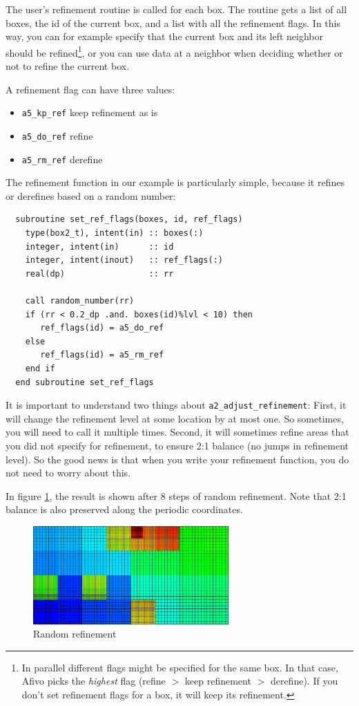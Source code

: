 \documentclass[a4paper, a4wide]{article}
\begin{document}
The user's refinement routine is called for each box.
The routine gets a list of all boxes, the id of the current box, and a list with
all the refinement flags.
In this way, you can for example specify that the current box and its left
neighbor should be refined\footnote{In parallel different flags might be
  specified for the same box.
  In that case, Afivo picks the \emph{highest} flag (refine $>$ keep refinement
  $>$ derefine).
  If you don't set refinement flags for a box, it will keep its refinement.}, or
you can use data at a neighbor when deciding whether or not to refine the
current box.

A refinement flag can have three values:
\begin{itemize}
  \item \texttt{a5\_kp\_ref} keep refinement as is
  \item \texttt{a5\_do\_ref} refine
  \item \texttt{a5\_rm\_ref} derefine
\end{itemize}
The refinement function in our example is particularly simple, because it
refines or derefines based on a random number:
\begin{lstlisting}
  subroutine set_ref_flags(boxes, id, ref_flags)
    type(box2_t), intent(in) :: boxes(:)
    integer, intent(in)      :: id
    integer, intent(inout)   :: ref_flags(:)
    real(dp)                 :: rr

    call random_number(rr)
    if (rr < 0.2_dp .and. boxes(id)%lvl < 10) then
       ref_flags(id) = a5_do_ref
    else
       ref_flags(id) = a5_rm_ref
    end if
  end subroutine set_ref_flags
\end{lstlisting}

It is important to understand two things about \texttt{a2\_adjust\_refinement}:
First, it will change the refinement level at some location by at most one.
So sometimes, you will need to call it multiple times.
Second, it will sometimes refine areas that you did not specify for refinement,
to ensure 2:1 balance (no jumps in refinement level).
So the good news is that when you write your refinement function, you do not
need to worry about this.

In figure \ref{fig:random-refinement}, the result is shown after 8 steps of
random refinement.
Note that 2:1 balance is also preserved along the periodic coordinates.

\begin{figure}
  \centering
  \includegraphics[width=7.5cm]{figures/random_ref.png}
  \caption{Random refinement}
  \label{fig:random-refinement}
\end{figure}
\end{document}
